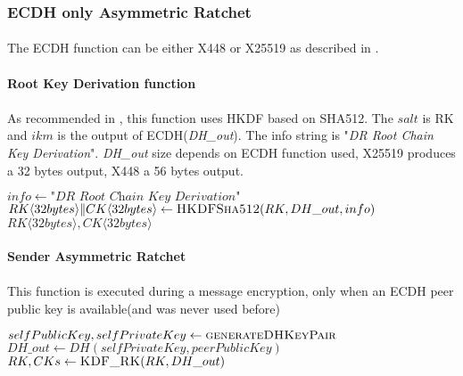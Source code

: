 \documentclass[a4paper,11pt]{article}
\begin{document}
    \subsubsection{ECDH only Asymmetric Ratchet}
      \paragraph{}The ECDH function can be either X448 or X25519 as described in \cite{rfc7748}.
      \paragraph*{Root Key Derivation function}
      \paragraph{}As recommended in \cite[section 5.2]{doubleRatchet}, this function uses HKDF\cite{rfc5869} based on SHA512. The $salt$ is RK and $ikm$ is the output of ECDH(\textit{DH\_out}). The info string is "\textit{DR Root Chain Key Derivation}". \textit{DH\_out} size depends on ECDH function used, X25519 produces a 32 bytes output, X448 a 56 bytes output.

      \begin{algorithmic}
          \State $info \gets \textit{"DR Root Chain Key Derivation"}$
          \State $RK\langle 32bytes\rangle\Arrowvert CK\langle 32bytes\rangle \gets \Call{HKDFSha512}{RK, DH\_out, info}$
          \State \Return $RK\langle 32bytes\rangle , CK\langle 32bytes\rangle$
        \EndFunction
      \end{algorithmic}

      \paragraph*{Sender Asymmetric Ratchet}
      \paragraph*{}This function is executed during a message encryption, only when an ECDH peer public key is available(and was never used before)
      \begin{algorithmic}
          \State $selfPublicKey, selfPrivateKey \gets \Call{generateDHKeyPair}{}$
          \Statex
          \State $DH\_out \gets DH(selfPrivateKey, peerPublicKey)$
          \State $RK, CKs \gets \Call{KDF\_RK}{RK, DH\_out}$
        \EndFunction
      \end{algorithmic}
\end{document}

